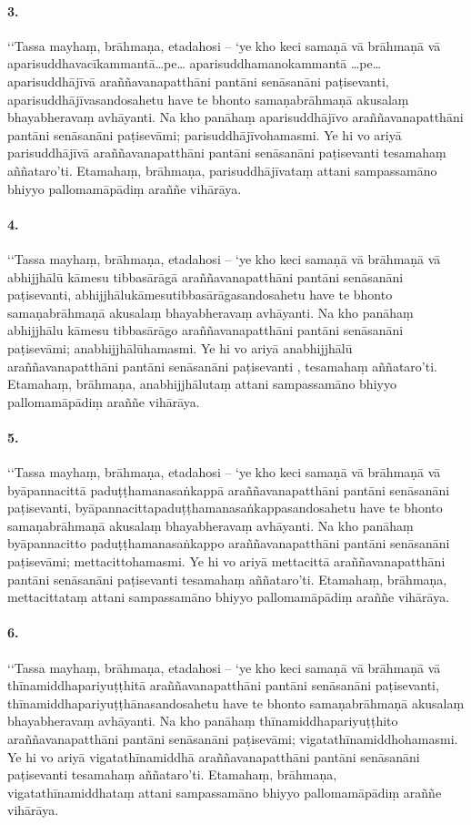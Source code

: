 \paragraph{3.} ‘‘Tassa mayhaṃ, brāhmaṇa, etadahosi – ‘ye kho keci samaṇā vā brāhmaṇā vā aparisuddhavacīkammantā…pe… aparisuddhamanokammantā …pe… aparisuddhājīvā araññavanapatthāni pantāni senāsanāni paṭisevanti, aparisuddhājīvasandosahetu have te bhonto samaṇabrāhmaṇā akusalaṃ bhayabheravaṃ avhāyanti. Na kho panāhaṃ aparisuddhājīvo araññavanapatthāni pantāni senāsanāni paṭisevāmi; parisuddhājīvohamasmi. Ye hi vo ariyā parisuddhājīvā araññavanapatthāni pantāni senāsanāni paṭisevanti tesamahaṃ aññataro’ti. Etamahaṃ, brāhmaṇa, parisuddhājīvataṃ attani sampassamāno bhiyyo pallomamāpādiṃ araññe vihārāya.

\paragraph{4.} ‘‘Tassa mayhaṃ, brāhmaṇa, etadahosi – ‘ye kho keci samaṇā vā brāhmaṇā vā abhijjhālū kāmesu tibbasārāgā araññavanapatthāni pantāni senāsanāni paṭisevanti, abhijjhālukāmesutibbasārāgasandosahetu have te bhonto samaṇabrāhmaṇā akusalaṃ bhayabheravaṃ avhāyanti. Na kho panāhaṃ abhijjhālu kāmesu tibbasārāgo araññavanapatthāni pantāni senāsanāni paṭisevāmi; anabhijjhālūhamasmi. Ye hi vo ariyā anabhijjhālū araññavanapatthāni pantāni senāsanāni paṭisevanti , tesamahaṃ aññataro’ti. Etamahaṃ, brāhmaṇa, anabhijjhālutaṃ attani sampassamāno bhiyyo pallomamāpādiṃ araññe vihārāya.

\paragraph{5.} ‘‘Tassa mayhaṃ, brāhmaṇa, etadahosi – ‘ye kho keci samaṇā vā brāhmaṇā vā byāpannacittā paduṭṭhamanasaṅkappā araññavanapatthāni pantāni senāsanāni paṭisevanti, byāpannacittapaduṭṭhamanasaṅkappasandosahetu have te bhonto samaṇabrāhmaṇā akusalaṃ bhayabheravaṃ avhāyanti. Na kho panāhaṃ byāpannacitto paduṭṭhamanasaṅkappo araññavanapatthāni pantāni senāsanāni paṭisevāmi; mettacittohamasmi. Ye hi vo ariyā mettacittā araññavanapatthāni pantāni senāsanāni paṭisevanti tesamahaṃ aññataro’ti. Etamahaṃ, brāhmaṇa, mettacittataṃ attani sampassamāno bhiyyo pallomamāpādiṃ araññe vihārāya.

\paragraph{6.} ‘‘Tassa mayhaṃ, brāhmaṇa, etadahosi – ‘ye kho keci samaṇā vā brāhmaṇā vā thīnamiddhapariyuṭṭhitā araññavanapatthāni pantāni senāsanāni paṭisevanti, thīnamiddhapariyuṭṭhānasandosahetu have te bhonto samaṇabrāhmaṇā akusalaṃ bhayabheravaṃ avhāyanti. Na kho panāhaṃ thīnamiddhapariyuṭṭhito araññavanapatthāni pantāni senāsanāni paṭisevāmi; vigatathīnamiddhohamasmi. Ye hi vo ariyā vigatathīnamiddhā araññavanapatthāni pantāni senāsanāni paṭisevanti tesamahaṃ aññataro’ti. Etamahaṃ, brāhmaṇa, vigatathīnamiddhataṃ attani sampassamāno bhiyyo pallomamāpādiṃ araññe vihārāya.

